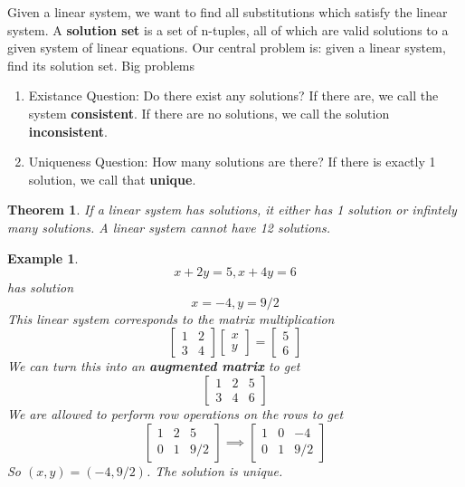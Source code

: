 \documentclass[11pt]{article}
\newtheorem{thm}{Theorem}
\newtheorem{ex}{Example}
\begin{document}
      Given a linear system, we want to find all substitutions which satisfy the linear
      system.
      A \textbf{solution set} is a set of n-tuples, all of which are valid solutions to a given system of linear equations.
      Our central problem is: given a linear system, find its solution set.
      Big problems
      \begin{enumerate}
        \item Existance Question: Do there exist any solutions? If there are, we call the system \textbf{consistent}. If there are no solutions, we call the solution \textbf{inconsistent}.
              \item Uniqueness Question: How many solutions are there? If there is exactly 1 solution, we call that \textbf{unique}.
      \end{enumerate}
      \begin{thm}
        If a linear system has solutions, it either has 1 solution or infintely many solutions.
        A linear system cannot have 12 solutions.
      \end{thm}
      \begin{ex}
        \[x + 2y = 5, x + 4y = 6\]
        has solution
        \[x = -4, y=9/2\]
        This linear system corresponds to the matrix multiplication
        \[\begin{bmatrix} 1 & 2 \\ 3 & 4 \end{bmatrix} \begin{bmatrix} x \\ y \end{bmatrix} = \begin{bmatrix} 5 \\ 6 \end{bmatrix}\]
        We can turn this into an \textbf{augmented matrix} to get
        \[
          \begin{bmatrix}
            1 & 2 & 5 \\
            3 & 4 & 6
            \end{bmatrix}
        \]
        We are allowed to perform row operations on the rows to get
\[
          \begin{bmatrix}
            1 & 2 & 5 \\
            0 & 1 & 9/2
          \end{bmatrix}
          \implies
          \begin{bmatrix}
            1 & 0 & -4\\
            0 & 1 & 9/2
            \end{bmatrix}
        \]
        So $(x,y) = (-4, 9/2)$. The solution is unique.
      \end{ex}
\end{document}
